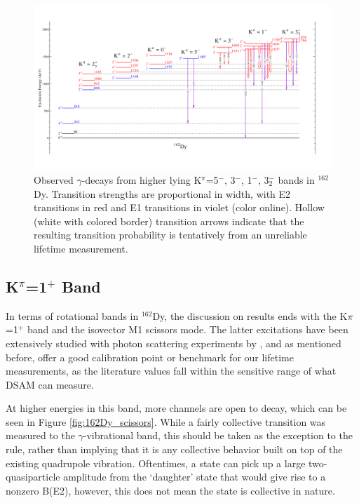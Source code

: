 \begin{landscape}
\begin{figure}[h!]
\begin{center}
\includegraphics[height=0.85\textheight]{figures/162Dy_otherNeg.pdf}
\caption{Observed $\gamma$-decays from higher lying K$^\pi$=5$^-$, 3$^-$, 1$^-$, 3$^-_2$ bands in $^{162}$Dy. Transition strengths are proportional in width, with E2 transitions in red and E1 transitions in violet (color online). Hollow (white with colored border) transition arrows indicate that the resulting transition probability is tentatively from an unreliable lifetime measurement. \label{fig:162Dy_highbands}}
\end{center}
\end{figure}
\end{landscape}

\subsection{K$^\pi$=1$^+$ Band}
In terms of rotational bands in $^{162}$Dy, the discussion on results ends with the K$\pi$=1$^+$ band and the isovector M1 scissors mode. The latter excitations have been extensively studied with photon scattering experiments by \cite{Margraf_gg'NRF_1995,Yates_162nnp1995}, and as mentioned before, offer a good calibration point or benchmark for our lifetime measurements, as the literature values fall within the sensitive range of what DSAM can measure. 


At higher energies in this band, more channels are open to decay, which can be seen in Figure \ref{fig:162Dy_scissors}. While a fairly collective transition was measured to the $\gamma$-vibrational band, this should be taken as the exception to the rule, rather than implying that it is any collective behavior built on top of the existing quadrupole vibration. Oftentimes, a state can pick up a large two-quasiparticle amplitude from the `daughter' state that would give rise to a nonzero B(E2), however, this does not mean the state is collective in nature.

